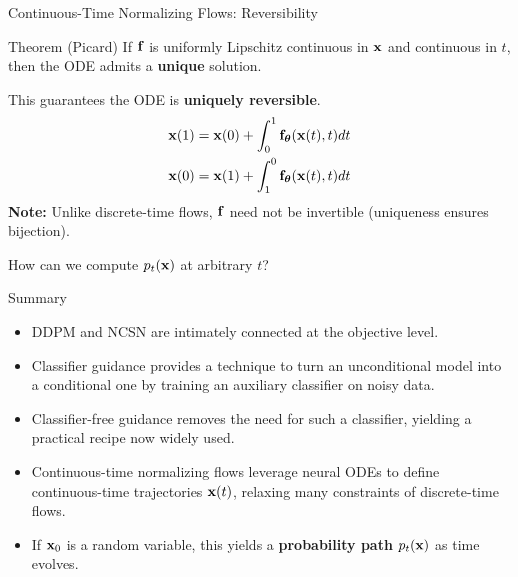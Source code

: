 \documentclass{beamer}
\begin{document}
\begin{frame}{Continuous-Time Normalizing Flows: Reversibility}
	\begin{block}{Theorem (Picard)}
		If $\mathbf{f}$ is uniformly Lipschitz continuous in $\mathbf{x}$ and continuous in $t$, then the ODE admits a \textbf{unique} solution.
	\end{block}
	This guarantees the ODE is \textbf{uniquely reversible}. 
	\begin{align*}
		\mathbf{x}(1) &= \mathbf{x}(0) + \int_{0}^{1} \mathbf{f}_{\boldsymbol{\theta}}(\mathbf{x}(t), t) dt \\
		\mathbf{x}(0) &= \mathbf{x}(1) + \int_{1}^{0} \mathbf{f}_{\boldsymbol{\theta}}(\mathbf{x}(t), t) dt
	\end{align*}
	\textbf{Note:} Unlike discrete-time flows, $\mathbf{f}$ need not be invertible (uniqueness ensures bijection).
	
	How can we compute $p_t(\mathbf{x})$ at arbitrary $t$?
\end{frame}
\begin{frame}{Summary}
	\begin{itemize}
		\item DDPM and NCSN are intimately connected at the objective level.	
		\vfill
		\item Classifier guidance provides a technique to turn an unconditional model into a conditional one by training an auxiliary classifier on noisy data.
		\vfill
		\item Classifier-free guidance removes the need for such a classifier, yielding a practical recipe now widely used.
		\vfill 
		\item Continuous-time normalizing flows leverage neural ODEs to define continuous-time trajectories $\mathbf{x}(t)$, relaxing many constraints of discrete-time flows.
		\vfill
		\item If $\mathbf{x}_0$ is a random variable, this yields a \textbf{probability path} $p_t(\mathbf{x})$ as time evolves.
	\end{itemize}
\end{frame}
\end{document}
